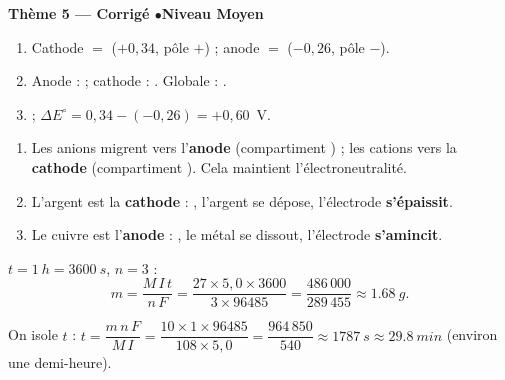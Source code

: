 \documentclass[11pt,a4paper]{article}
\begin{document}
\begin{center}\color{primarydark}\large\bfseries Thème 5 — Corrigé \quad$\bullet$\quad Niveau Moyen\end{center}

\begin{corrige}
\begin{enumerate}[label=\alph*)]
  \item Cathode $=$  ($+0{,}34$, pôle $+$) ; anode $=$  ($-0{,}26$, pôle $-$).
  \item Anode :  ; cathode : . Globale :
        .
  \item {} ; $\Delta E^{\circ}=0{,}34-(-0{,}26)=+0{,}60$~V.
\end{enumerate}
\end{corrige}

\begin{corrige}
\begin{enumerate}[label=\alph*)]
  \item Les anions  migrent vers l'\textbf{anode} (compartiment ) ; les cations
         vers la \textbf{cathode} (compartiment ). Cela maintient l'électroneutralité.
  \item L'argent est la \textbf{cathode} : , l'argent se dépose, l'électrode
        \textbf{s'épaissit}.
  \item Le cuivre est l'\textbf{anode} : , le métal se dissout, l'électrode
        \textbf{s'amincit}.
\end{enumerate}
\end{corrige}

\begin{corrige}
$t=\qty{1}{h}=\qty{3600}{s}$, $n=3$ :
\[
m=\frac{M\,I\,t}{n\,F}=\frac{27\times 5{,}0\times 3600}{3\times 96485}
=\frac{486\,000}{289\,455}\approx\qty{1.68}{g}.
\]
\end{corrige}

\begin{corrige}
On isole $t$ : $t=\dfrac{m\,n\,F}{M\,I}=\dfrac{10\times 1\times 96485}{108\times 5{,}0}
=\dfrac{964\,850}{540}\approx\qty{1787}{s}\approx\qty{29.8}{min}$ (environ une demi-heure).
\end{corrige}
\end{document}

